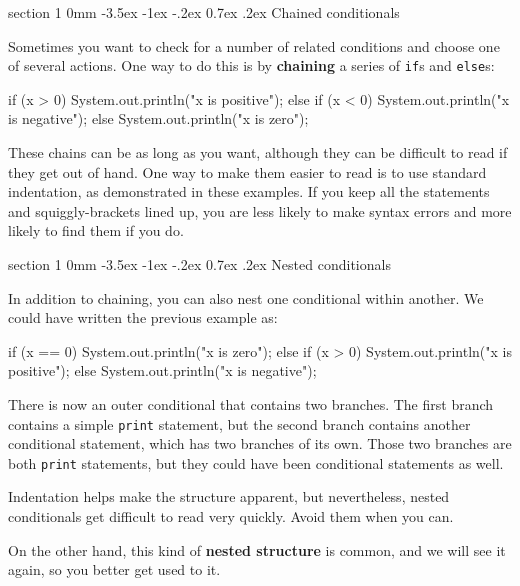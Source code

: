 \documentclass{book}
\makeatletter
\renewcommand{\section}{\@startsection 
    {section} {1} {0mm}%
    {-3.5ex \@plus -1ex \@minus -.2ex}%
    {0.7ex \@plus.2ex}%
    {\normalfont\Large\bfseries}}
\makeatother
\begin{document}
\section {Chained conditionals}

Sometimes you want to check for a number of related conditions
and choose one of several actions.  One way to do this is by
{\bf chaining} a series of {\tt if}s and {\tt else}s:

\begin{verbatimtab}
    if (x > 0) {
      System.out.println("x is positive");
    } else if (x < 0) {
      System.out.println("x is negative");
    } else {
      System.out.println("x is zero");
    }
\end{verbatimtab}
%
These chains can be as long as you want, although they can
be difficult to read if they get out of hand.  One way to
make them easier to read is to use standard indentation,
as demonstrated in these examples.  If you keep all the
statements and squiggly-brackets lined up, you are less
likely to make syntax errors and more likely to find them
if you do.


\section{Nested conditionals}

In addition to chaining, you can also nest one conditional
within another.  We could have written the previous example
as:

\begin{verbatimtab}
    if (x == 0) {
      System.out.println("x is zero");
    } else {
      if (x > 0) {
        System.out.println("x is positive");
      } else {
        System.out.println("x is negative");
      }
    }
\end{verbatimtab}
%
There is now an outer conditional that contains two branches.  The
first branch contains a simple {\tt print} statement, but the second
branch contains another conditional statement, which has two branches
of its own.  Those two branches are both {\tt print}
statements, but they could have been conditional statements as
well.

Indentation helps make the structure
apparent, but nevertheless, nested conditionals get difficult to read
very quickly.  Avoid them when you can.

On the other hand, this kind of {\bf nested structure} is common, and
we will see it again, so you better get used to it.
\end{document}
